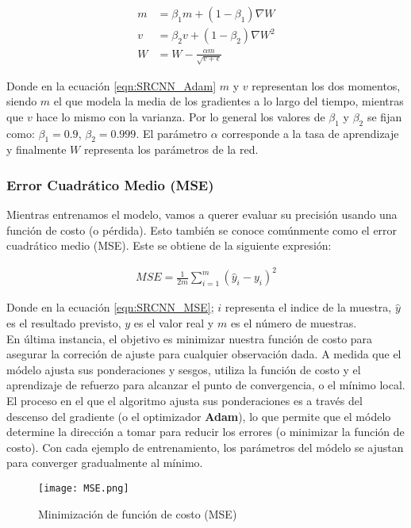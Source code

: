 \begin{equation}
    \label{eqn:SRCNN_Adam}
    \begin{split}
        m&=\beta_1m+(1-\beta_1)\nabla W\\
        v&=\beta_2v+(1-\beta_2)\nabla W^2\\
        W&=W-\frac{\alpha m}{\sqrt{v+\epsilon}}
    \end{split}
\end{equation}

Donde en la ecuación \eqref{eqn:SRCNN_Adam} $m$ y $v$ representan los dos momentos, siendo $m$ el que modela la media de los
gradientes a lo largo del tiempo, mientras que $v$ hace lo mismo con la varianza. Por lo general los valores de $\beta_1$ y
$\beta_2$ se fijan como: $\beta_1=0.9$, $\beta_2=0.999$. El parámetro $\alpha$ corresponde a la tasa de aprendizaje y
finalmente $W$ representa los parámetros de la red.

\subsubsection{Error Cuadrático Medio (MSE)}
Mientras entrenamos el modelo, vamos a querer evaluar su precisión usando una función de costo (o pérdida). Esto también
se conoce comúnmente como el error cuadrático medio (MSE). Este se obtiene de la siguiente expresión:

\begin{align}
    \label{eqn:SRCNN_MSE}
    MSE=\frac{1}{2m}\sum_{i=1}^{m}(\hat{y}_i-y_i)^2
\end{align}

Donde en la ecuación \eqref{eqn:SRCNN_MSE}; $i$ representa el indice de la muestra, $\hat{y}$ es el resultado previsto,
$y$ es el valor real y  $m$ es el número de muestras.\\
En última instancia, el objetivo es minimizar nuestra función de costo para asegurar la correción de ajuste para cualquier
observación dada. A medida que el módelo ajusta sus ponderaciones y sesgos, utiliza la función de costo  y el aprendizaje
de refuerzo para alcanzar el punto de convergencia, o el mínimo local. El proceso en el que el algoritmo ajusta sus
ponderaciones es a través del descenso del gradiente (o el optimizador \textbf{Adam}), lo que permite que el módelo
determine la dirección a tomar para reducir los errores (o minimizar la función de costo). Con cada ejemplo de entrenamiento,
los parámetros del módelo se ajustan para converger gradualmente al mínimo.

\begin{figure}[H]
    \label{fig:SRCNN_MSE}
    \centering
    \texttt{[image: MSE.png]}
    \caption{Minimización de función de costo (MSE)}
\end{figure}